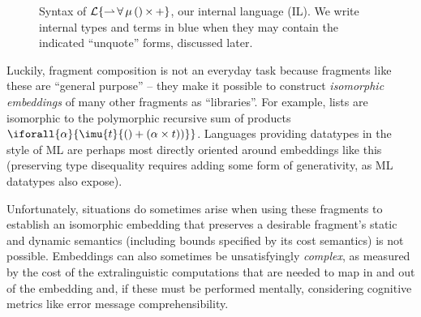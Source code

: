\begin{figure}[h]
\small
\hspace{-5px}
\caption{Syntax of {$\mathcal{L}\{{\rightharpoonup}\,{\forall}\,{\mu}\,{()}\,{\times}\,{+}\}$}, our internal language (IL). We write internal types and terms in blue when they may contain the indicated ``unquote'' forms, discussed later.}
\label{syntax-IL}
\end{figure}

Luckily, fragment composition is not an everyday task because fragments like these are ``general purpose'' -- they make it possible to construct \emph{isomorphic embeddings} of many other fragments as ``libraries''. For example, lists are isomorphic to  the polymorphic recursive sum of products $\iforall{\alpha}{\imu{t}{\iunit + (\alpha \times t))}}$. Languages providing datatypes in the style of ML  are perhaps most directly oriented around embeddings like this (preserving type disequality requires adding some form of generativity, as ML datatypes also expose). %

Unfortunately, situations do sometimes arise when using these fragments to establish an isomorphic embedding that preserves a desirable fragment's  static and dynamic semantics (including bounds specified by its cost semantics) is not possible. 
Embeddings can also sometimes be unsatisfyingly \emph{complex}, as measured by the cost of the extralinguistic computations that are needed to map in and out of the embedding and, if these  must be performed mentally, considering  cognitive metrics like  error message comprehensibility. %

